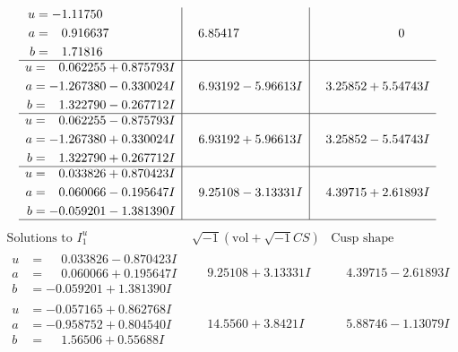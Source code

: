 \documentclass[1p]{elsarticle_modified}
\theoremstyle{definition}
\newcommand{\I}{\sqrt{-1}}
\begin{document}
$$\begin{array}{c|c|c}
\begin{aligned}
u &= -1.11750\phantom{ +0.000000I} \\
a &= \phantom{-}0.916637\phantom{ +0.000000I} \\
b &= \phantom{-}1.71816\phantom{ +0.000000I}\end{aligned}
 & \phantom{-}6.85417\phantom{ +0.000000I} & \phantom{-0.000000 } 0 \\ \hline\begin{aligned}
u &= \phantom{-}0.062255 + 0.875793 I \\
a &= -1.267380 - 0.330024 I \\
b &= \phantom{-}1.322790 - 0.267712 I\end{aligned}
 & \phantom{-}6.93192 - 5.96613 I & \phantom{-}3.25852 + 5.54743 I \\ \hline\begin{aligned}
u &= \phantom{-}0.062255 - 0.875793 I \\
a &= -1.267380 + 0.330024 I \\
b &= \phantom{-}1.322790 + 0.267712 I\end{aligned}
 & \phantom{-}6.93192 + 5.96613 I & \phantom{-}3.25852 - 5.54743 I \\ \hline\begin{aligned}
u &= \phantom{-}0.033826 + 0.870423 I \\
a &= \phantom{-}0.060066 - 0.195647 I \\
b &= -0.059201 - 1.381390 I\end{aligned}
 & \phantom{-}9.25108 - 3.13331 I & \phantom{-}4.39715 + 2.61893 I\\
 \hline 
 \end{array}$$\newpage$$\begin{array}{c|c|c}  
\text{Solutions to }I^u_{1}& \I (\text{vol} + \sqrt{-1}CS) & \text{Cusp shape}\\
 \hline 
\begin{aligned}
u &= \phantom{-}0.033826 - 0.870423 I \\
a &= \phantom{-}0.060066 + 0.195647 I \\
b &= -0.059201 + 1.381390 I\end{aligned}
 & \phantom{-}9.25108 + 3.13331 I & \phantom{-}4.39715 - 2.61893 I \\ \hline\begin{aligned}
u &= -0.057165 + 0.862768 I \\
a &= -0.958752 + 0.804540 I \\
b &= \phantom{-}1.56506 + 0.55688 I\end{aligned}
 & \phantom{-}14.5560 + 3.8421 I & \phantom{-}5.88746 - 1.13079 I \\ \hline\begin{aligned}

\end{aligned}
\end{array}$$
\end{document}
